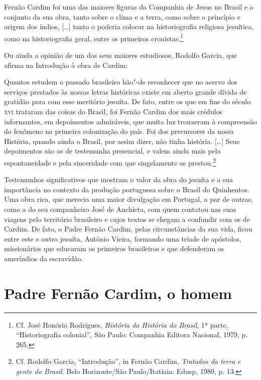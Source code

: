 \begin{hedraquote} 
Fernão Cardim foi uma das maiores figuras da
Companhia de Jesus no Brasil e o conjunto da sua obra, tanto sobre o
clima e a terra, como sobre o princípio e origem dos índios, [\ldots{}]
tanto o poderia colocar na historiografia religiosa jesuítica, como na
historiografia geral, entre os primeiros cronistas.\footnote{ Cf. 
José Honório Rodrigues, \textit{História da História do Brasil}, 
1ª parte, ``Historiografia colonial'', São Paulo: Companhia Editora
Nacional, 1979, p. 265.}
\end{hedraquote}

Ou ainda a opinião de um dos seus maiores estudiosos, Rodolfo
Garcia, que afirma na Introdução à obra de Cardim:

\begin{hedraquote} 
Quantos estudem o passado brasileiro hão"-de reconhecer que
no acervo dos serviços prestados às nossas letras históricas existe em
aberto grande dívida de gratidão para com esse meritório jesuíta. De
fato, entre os que em fins do século \textsc{xvi} trataram das coisas do
Brasil, foi Fernão Cardim dos mais crédulos informantes, em depoimentos
admiráveis, que muita luz trouxeram à compreensão do fenômeno na
primeira colonização do país. Foi dos precursores da nossa História,
quando ainda o Brasil, por assim dizer, não tinha história. [\ldots{}] Seus
depoimentos são os de testemunha presencial, e valem ainda mais pela
espontaneidade e pela sinceridade com que singelamente os prestou.\footnote{ Cf. 
Rodolfo Garcia, ``Introdução'', in Fernão Cardim, \textit{Tratados da terra e 
gente do Brasil}. Belo Horizonte/São Paulo/Itatiaia: Edusp, 1980, p. 13.} 
\end{hedraquote}

Testemunhos significativos que mostram o valor da obra do
jesuíta e a sua importância no contexto da produção portuguesa sobre o
Brasil do Quinhentos. Uma obra rica, que merecia uma maior divulgação em
Portugal, a par de outras, como a do seu companheiro José de Anchieta,
com quem contatou nas suas viagens pelo território brasileiro e cujos
textos se chegam a confundir com os de Cardim. De fato, o Padre Fernão
Cardim, pelas circunstâncias da sua vida, ficou entre este e outro
jesuíta, Antônio Vieira, formando uma tríade de apóstolos, missionários
que educaram os primeiros brasileiros e que defenderam os ameríndios da
escravidão. 

\section{Padre Fernão Cardim, o homem}

